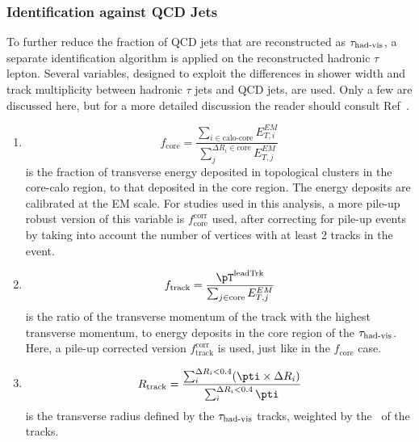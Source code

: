 \subsubsection{Identification against QCD Jets}
\label{sec:idTauJets}
\par To further reduce the fraction of QCD jets that are reconstructed as $\tau_{\text{had-vis}}$, a separate 
identification algorithm is applied on the reconstructed hadronic $\tau$ lepton. Several variables,
 designed to exploit the differences in shower width and track multiplicity between 
hadronic $\tau$ jets and QCD jets, are used. Only a few are discussed here, but for a more detailed discussion the reader should 
consult Ref~\cite{ATLAS:tauvars}. 

\begin{enumerate}
\item 
\begin{equation*}
f_{\text{core}} = \frac{\sum_{i\in\text{calo-core}} E_{T,i}^{EM}}{ \sum_{j}^{\Delta R_i\in\text{core}} E_{T,j}^{EM}}
\end{equation*}
is the fraction of transverse energy deposited in topological clusters in the core-calo region, to that deposited in the core
 region. The energy deposits are calibrated at the EM scale. For studies used in this analysis, 
a more pile-up robust version of this variable is $f_{\text{core}}^{\text{corr}}$ used, 
after correcting for pile-up events by taking into account the number of vertices with at least 2 tracks in the event.  

\item 
\begin{equation*}
f_{\text{track}} = \frac{\pT^{\text{leadTrk}}}{ \sum_{j\in\text{core}} E_{T,j}^{EM}}
\end{equation*}
is the ratio of the transverse momentum of the track with the highest transverse momentum, to energy deposits in the core 
region of the $\tau_{\text{had-vis}}$. Here, a pile-up corrected version $f_{\text{track}}^{\text{corr}}$ is used, just like in the 
$f_{\text{core}}$ case. 

\item 
\begin{equation*}
R_{\text{track}} = \frac{\sum_i^{\Delta R_i<0.4}(\pti\times\Delta R_i)}{\sum_i^{\Delta R_i<0.4} \pti} 
\end{equation*}
is the transverse radius defined by the $\tau_{\text{had-vis}}$ tracks, weighted by the \pt\ of the tracks. 


\end{enumerate}
